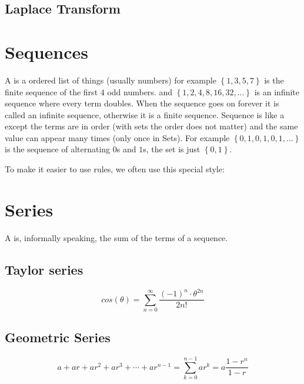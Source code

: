 \subsection{Laplace Transform}


\section{Sequences}
A  is a ordered list of things (usually numbers) for example $\left\{1, 3, 5, 7\right\}$ is the finite sequence of the first $4$ odd numbers. and $\left\{1, 2, 4, 8, 16, 32, ...\right\}$ is an infinite sequence where every term doubles. When the sequence goes on forever it is called an infinite sequence, otherwise it is a finite sequence. Sequence is like a  except the terms are in order (with sets the order does not matter) and the same value can appear many times (only once in Sets). For example $\left\{0, 1, 0, 1, 0, 1, ...\right\}$ is the sequence of alternating $0$s and $1$s, the set is just $\left\{0,1\right\}$.

To make it easier to use rules, we often use this special style:

\section{Series}
A  is, informally speaking, the sum of the terms of a sequence.

\subsection{Taylor series}
\begin{equation}
cos(\theta) = \sum_{n=0}^{\infty} \frac{(-1)^n \cdot \theta^{2n}}{2n!}
\end{equation}

\subsection{Geometric Series}
\begin{equation}
a + ar + ar^2 + ar^3 + \cdots + ar^{n-1} = \sum_{k=0}^{n-1}ar^k = a \frac{1-r^n}{1-r}
\end{equation}



